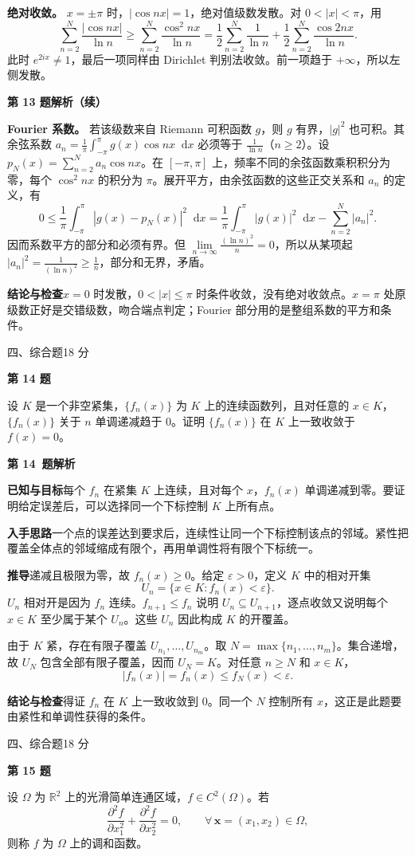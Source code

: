 \documentclass[UTF8,zihao=-4,fontset=fandol]{ctexart}
\newcommand{\dd}{\mathop{}\!\mathrm{d}}
\newcommand{\Question}[3]{%
  \clearpage
  \def\CurrentNumber{#1}%
  \pdfbookmark[1]{第 #1 题}{q#1}%
  {\small #2\hfill #3 分}\par\medskip
  {\Large\bfseries 第 #1 题}\par\medskip
  \fontsize{14}{22}\selectfont
}
\newcommand{\Solution}{%
  \clearpage
  \fontsize{12}{18}\selectfont
  {\large\bfseries 第 \CurrentNumber\ 题解析}\par\smallskip
}
\newcommand{\Known}{\par\textbf{已知与目标}\quad}
\newcommand{\Method}{\par\textbf{入手思路}\quad}
\newcommand{\Derive}{\par\textbf{推导}\quad}
\newcommand{\Verify}{\par\textbf{结论与检查}\quad}
\begin{document}
\textbf{绝对收敛。} $x=\pm\pi$ 时，$|\cos nx|=1$，绝对值级数发散。对 $0<|x|<\pi$，用
\[
\sum_{n=2}^{N}\frac{|\cos nx|}{\ln n}
\ge\sum_{n=2}^{N}\frac{\cos^2 nx}{\ln n}
=\frac12\sum_{n=2}^{N}\frac1{\ln n}
+\frac12\sum_{n=2}^{N}\frac{\cos 2nx}{\ln n}.
\]
此时 $e^{2ix}\ne1$，最后一项同样由 Dirichlet 判别法收敛。前一项趋于 $+\infty$，所以左侧发散。

\clearpage
{\large\bfseries 第 13 题解析（续）}\par\smallskip
\textbf{Fourier 系数。} 若该级数来自 Riemann 可积函数 $g$，则 $g$ 有界，$|g|^2$ 也可积。其余弦系数 $a_n=\frac1\pi\int_{-\pi}^{\pi}g(x)\cos nx\dd x$ 必须等于 $\frac1{\ln n}$（$n\ge2$）。设 $p_N(x)=\sum_{n=2}^{N}a_n\cos nx$。在 $[-\pi,\pi]$ 上，频率不同的余弦函数乘积积分为零，每个 $\cos^2 nx$ 的积分为 $\pi$。展开平方，由余弦函数的这些正交关系和 $a_n$ 的定义，有
\[
0\le\frac1\pi\int_{-\pi}^{\pi}|g(x)-p_N(x)|^2\dd x
=\frac1\pi\int_{-\pi}^{\pi}|g(x)|^2\dd x-\sum_{n=2}^{N}|a_n|^2.
\]
因而系数平方的部分和必须有界。但 $\lim\limits_{n\to\infty}\frac{(\ln n)^2}{n}=0$，所以从某项起 $|a_n|^2=\frac{1}{(\ln n)^2}\ge\frac{1}{n}$，部分和无界，矛盾。
\Verify $x=0$ 时发散，$0<|x|\le\pi$ 时条件收敛，没有绝对收敛点。$x=\pi$ 处原级数正好是交错级数，吻合端点判定；Fourier 部分用的是整组系数的平方和条件。

\Question{14}{四、综合题}{18}
设 $K$ 是一个非空紧集，$\{f_n(x)\}$ 为 $K$ 上的连续函数列，且对任意的 $x\in K$，$\{f_n(x)\}$ 关于 $n$ 单调递减趋于 $0$。证明 $\{f_n(x)\}$ 在 $K$ 上一致收敛于 $f(x)=0$。

\Solution
\Known 每个 $f_n$ 在紧集 $K$ 上连续，且对每个 $x$，$f_n(x)$ 单调递减到零。要证明给定误差后，可以选择同一个下标控制 $K$ 上所有点。
\Method 一个点的误差达到要求后，连续性让同一个下标控制该点的邻域。紧性把覆盖全体点的邻域缩成有限个，再用单调性将有限个下标统一。
\Derive 递减且极限为零，故 $f_n(x)\ge 0$。给定 $\varepsilon>0$，定义 $K$ 中的相对开集
\[
U_n=\{x\in K:f_n(x)<\varepsilon\}.
\]
$U_n$ 相对开是因为 $f_n$ 连续。$f_{n+1}\le f_n$ 说明 $U_n\subseteq U_{n+1}$，逐点收敛又说明每个 $x\in K$ 至少属于某个 $U_n$。这些 $U_n$ 因此构成 $K$ 的开覆盖。

由于 $K$ 紧，存在有限子覆盖 $U_{n_1},\dots,U_{n_m}$。取 $N=\max\{n_1,\dots,n_m\}$。集合递增，故 $U_N$ 包含全部有限子覆盖，因而 $U_N=K$。对任意 $n\ge N$ 和 $x\in K$，
\[
|f_n(x)|=f_n(x)\le f_N(x)<\varepsilon.
\]
\Verify 得证 $f_n$ 在 $K$ 上一致收敛到 $0$。同一个 $N$ 控制所有 $x$，这正是此题要由紧性和单调性获得的条件。

\Question{15}{四、综合题}{18}
设 $\Omega$ 为 $\mathbb R^2$ 上的光滑简单连通区域，$f\in C^2(\Omega)$。若
\[
\frac{\partial^2f}{\partial x_1^2}+\frac{\partial^2f}{\partial x_2^2}=0,
\qquad \forall\,\mathbf x=(x_1,x_2)\in\Omega,
\]
则称 $f$ 为 $\Omega$ 上的调和函数。
\end{document}
